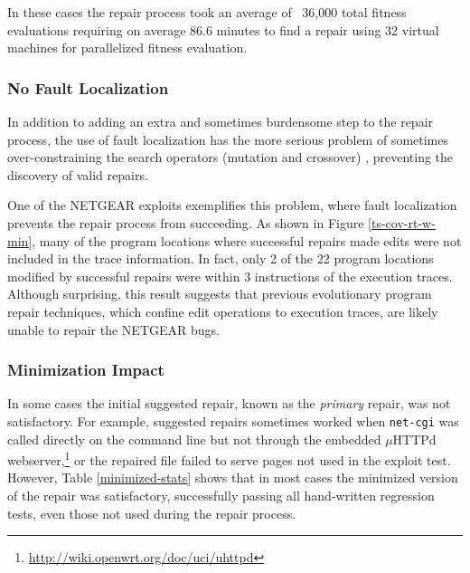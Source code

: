 \documentclass{sigcomm-alternate}
\begin{document}
In these cases the repair process took an average of ~36,000 total fitness
evaluations requiring on average 86.6 minutes to find a repair using 32
virtual machines for parallelized fitness evaluation.

\subsubsection{No Fault Localization}
\label{no-fault-localization}

In addition to adding an extra and sometimes burdensome step to the
repair process, the use of fault localization has the more serious
problem of sometimes over-constraining the search operators (mutation
and crossover) \cite{schulte2013optimization}, preventing the
discovery of valid repairs.

One of the NETGEAR exploits exemplifies this problem, where fault
localization prevents the repair process from succeeding.  As shown in
Figure \ref{ts-cov-rt-w-min}, many of the program locations where successful
repairs made edits were not included in the trace information.
In fact, only 2 of the 22 program locations modified by successful repairs 
were within 3 instructions of the execution traces.  Although
surprising, this result suggests that 
previous evolutionary program repair techniques, which confine edit
operations to execution traces, are likely unable to repair the NETGEAR
bugs.

\subsubsection{Minimization Impact}
\label{minimization}

In some cases the initial suggested repair, known as the
\emph{primary} repair, was not satisfactory.  For
example, suggested repairs sometimes worked when \texttt{net-cgi} was
called directly on the command line but not through the embedded
$\mu$HTTPd webserver,\footnote{\url{http://wiki.openwrt.org/doc/uci/uhttpd}}
or the repaired file failed to serve pages not used in the
exploit test.  However, Table \ref{minimized-stats} shows that in most
cases the minimized version of the repair was satisfactory,
successfully passing all hand-written regression tests, even those not used
during the repair process. 
\end{document}

